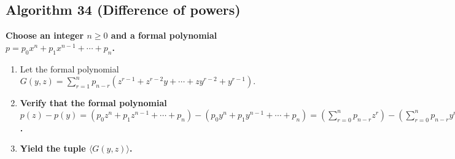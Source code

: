 \documentclass[twocolumn]{article}
\begin{document}
		\subsection{Algorithm 34 (Difference of powers)}\label{sec:algorithm 34}
			\textbf{Choose an integer $n\ge 0$ and a formal polynomial $p=p_0x^n+p_1x^{n-1}+\cdots+p_n$.}
			\begin{enumerate}
				\item Let the formal polynomial $G(y,z)=\sum_{r=1}^n p_{n-r}(z^{r-1}+z^{r-2}y+\cdots+zy^{r-2}+y^{r-1})$.
				\item \textbf{Verify that the formal polynomial $p(z)-p(y)=(p_0z^n+p_1z^{n-1}+\cdots+p_n)-(p_0y^n+p_1y^{n-1}+\cdots+p_n)=(\sum_{r=0}^n p_{n-r}z^r)-(\sum_{r=0}^n p_{n-r}y^r)=\sum_{r=1}^n p_{n-r}(z^r-y^r)=\sum_{r=1}^n p_{n-r}(z-y)(z^{r-1}+z^{r-2}y+\cdots+zy^{r-2}+y^{r-1})=(z-y)\sum_{r=1}^n p_{n-r}(z^{r-1}+z^{r-2}y+\cdots+zy^{r-2}+y^{r-1})=(z-y)G(y,z)$.}
				\item \textbf{Yield the tuple $\langle G(y,z)\rangle$.}
			\end{enumerate}
\end{document}
